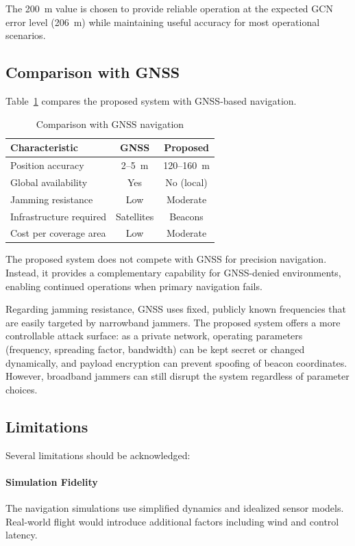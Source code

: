 \documentclass[master,final,11pt]{iscs-thesis}
\begin{document}
The 200~m value is chosen to provide reliable operation at the expected GCN error level (206~m) while maintaining useful accuracy for most operational scenarios.

\subsection{Comparison with GNSS}

Table~\ref{tab:gnss_comparison} compares the proposed system with GNSS-based navigation.

\begin{table}[htbp]
\centering
\caption{Comparison with GNSS navigation}
\label{tab:gnss_comparison}
\begin{tabular}{@{}lcc@{}}
\toprule
\textbf{Characteristic} & \textbf{GNSS} & \textbf{Proposed} \\
\midrule
Position accuracy & 2--5~m & 120--160~m \\
Global availability & Yes & No (local) \\
Jamming resistance & Low & Moderate \\
Infrastructure required & Satellites & Beacons \\
Cost per coverage area & Low & Moderate \\
\bottomrule
\end{tabular}
\end{table}

The proposed system does not compete with GNSS for precision navigation.
Instead, it provides a complementary capability for GNSS-denied environments, enabling continued operations when primary navigation fails.

Regarding jamming resistance, GNSS uses fixed, publicly known frequencies that are easily targeted by narrowband jammers.
The proposed system offers a more controllable attack surface: as a private network, operating parameters (frequency, spreading factor, bandwidth) can be kept secret or changed dynamically, and payload encryption can prevent spoofing of beacon coordinates.
However, broadband jammers can still disrupt the system regardless of parameter choices.

\subsection{Limitations}

Several limitations should be acknowledged:

\paragraph{Simulation Fidelity}
The navigation simulations use simplified dynamics and idealized sensor models.
Real-world flight would introduce additional factors including wind and control latency.
\end{document}
